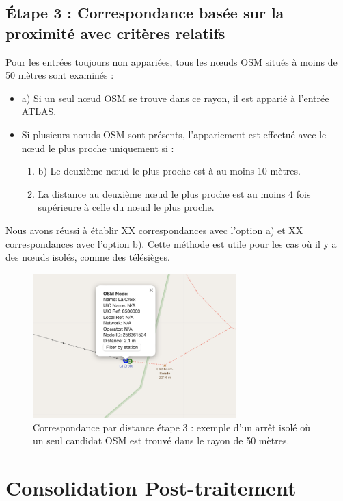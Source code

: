 \subsection{Étape 3 : Correspondance basée sur la proximité avec critères relatifs}  
Pour les entrées toujours non appariées, tous les nœuds OSM situés à moins de 50 mètres sont examinés :  
\begin{itemize}  
    \item a) Si un seul nœud OSM se trouve dans ce rayon, il est apparié à l’entrée ATLAS.  
    \item Si plusieurs nœuds OSM sont présents, l’appariement est effectué avec le nœud le plus proche uniquement si :  
    \begin{enumerate}  
        \item b) Le deuxième nœud le plus proche est à au moins 10 mètres.  
        \item La distance au deuxième nœud le plus proche est au moins 4 fois supérieure à celle du nœud le plus proche.  
    \end{enumerate}  
\end{itemize}  
Nous avons réussi à établir XX correspondances avec l'option a) et XX correspondances avec l'option b).  
Cette méthode est utile pour les cas où il y a des nœuds isolés, comme des télésièges.  

\begin{figure}[h] 
    \centering
    \includegraphics[width=0.7\textwidth]{../figures/correspondances/distance_3.png}
    \caption[Correspondance par distance – étape 3]{Correspondance par distance étape 3 : exemple d'un arrêt isolé où un seul candidat OSM est trouvé dans le rayon de 50 mètres.}
    \label{fig:distance_stage3}
\end{figure} 

\section{Consolidation Post-traitement}

